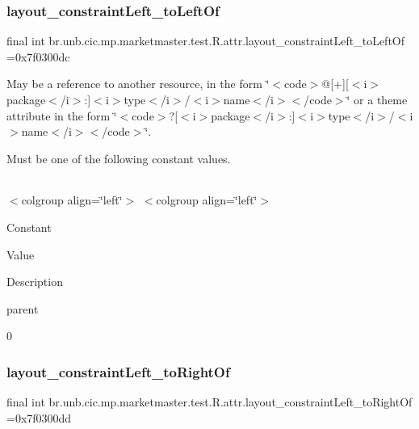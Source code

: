 \subsubsection{\texorpdfstring{layout\+\_\+constraint\+Left\+\_\+to\+Left\+Of}{layout\_constraintLeft\_toLeftOf}}
{\footnotesize\ttfamily final int br.\+unb.\+cic.\+mp.\+marketmaster.\+test.\+R.\+attr.\+layout\+\_\+constraint\+Left\+\_\+to\+Left\+Of =0x7f0300dc\hspace{0.3cm}{\ttfamily [static]}}

May be a reference to another resource, in the form \char`\"{}$<$code$>$@\mbox{[}+\mbox{]}\mbox{[}$<$i$>$package$<$/i$>$\+:\mbox{]}$<$i$>$type$<$/i$>$/$<$i$>$name$<$/i$>$$<$/code$>$\char`\"{} or a theme attribute in the form \char`\"{}$<$code$>$?\mbox{[}$<$i$>$package$<$/i$>$\+:\mbox{]}$<$i$>$type$<$/i$>$/$<$i$>$name$<$/i$>$$<$/code$>$\char`\"{}. 

Must be one of the following constant values.

\tabulinesep=1mm
\begin{longtabu} spread 0pt [c]{*{0}{|X[-1]}|}
\hline
\end{longtabu}
$<$colgroup align=\char`\"{}left\char`\"{}$>$ $<$colgroup align=\char`\"{}left\char`\"{}$>$ 

Constant

Value

Description 

parent

0\mbox{\label{classbr_1_1unb_1_1cic_1_1mp_1_1marketmaster_1_1test_1_1R_1_1attr_a0bb61343fa29d044a041f022ec1b04d9}} 
\subsubsection{\texorpdfstring{layout\+\_\+constraint\+Left\+\_\+to\+Right\+Of}{layout\_constraintLeft\_toRightOf}}
{\footnotesize\ttfamily final int br.\+unb.\+cic.\+mp.\+marketmaster.\+test.\+R.\+attr.\+layout\+\_\+constraint\+Left\+\_\+to\+Right\+Of =0x7f0300dd\hspace{0.3cm}{\ttfamily [static]}}

